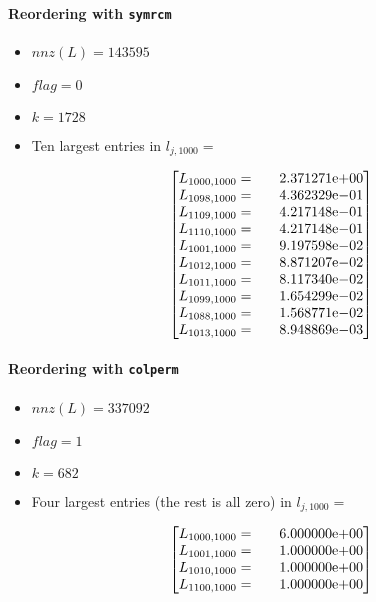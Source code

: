 \begin{enumerate}
\paragraph*{Reordering with \texttt{symrcm}}
\begin{itemize}
\item $nnz(L)= 143595$
\item $flag= 0$
\item $k= 1728$
\item Ten largest entries in $l_{j,1000}= $

$$
\begin{bmatrix}
L_{1000,1000}=  & \quad {2.371271}\mathrm{e}{+00}\\
L_{1098,1000}=  & \quad {4.362329}\mathrm{e}{-01}\\
L_{1109,1000}=  & \quad {4.217148}\mathrm{e}{-01}\\
L_{1110,1000}=  & \quad {4.217148}\mathrm{e}{-01}\\
L_{1001,1000}=  & \quad {9.197598}\mathrm{e}{-02}\\
L_{1012,1000}=  & \quad {8.871207}\mathrm{e}{-02}\\
L_{1011,1000}=  & \quad {8.117340}\mathrm{e}{-02}\\
L_{1099,1000}=  & \quad {1.654299}\mathrm{e}{-02}\\
L_{1088,1000}=  & \quad {1.568771}\mathrm{e}{-02}\\
L_{1013,1000}=  & \quad {8.948869}\mathrm{e}{-03}\\
\end{bmatrix}
$$
\end{itemize}
\newpage
\paragraph*{Reordering with \texttt{colperm}}
\begin{itemize}
\item $nnz(L)= 337092$
\item $flag= 1$
\item $k= 682$
\item Four largest entries (the rest is all zero) in $l_{j,1000}= $ 

$$
\begin{bmatrix}
L_{1000,1000}=  & \quad {6.000000}\mathrm{e}{+00}\\
L_{1001,1000}=  & \quad {1.000000}\mathrm{e}{+00}\\
L_{1010,1000}=  & \quad {1.000000}\mathrm{e}{+00}\\
L_{1100,1000}=  & \quad {1.000000}\mathrm{e}{+00}\\
\end{bmatrix}
$$
\end{itemize}
\end{enumerate}

